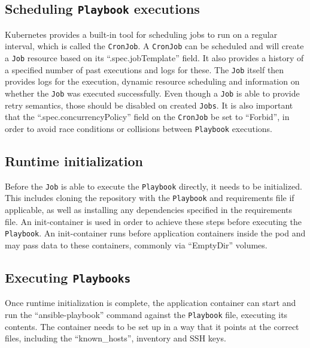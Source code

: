 \subsection{Scheduling \texttt{Playbook} executions}
Kubernetes provides a built-in tool for scheduling jobs to run on a regular interval, which is called the \texttt{CronJob}.
A \texttt{CronJob} can be scheduled and will create a \texttt{Job} resource based on its \enquote{.spec.jobTemplate} field.
It also provides a history of a specified number of past executions and logs for these.
The \texttt{Job} itself then provides logs for the execution, dynamic resource scheduling and information on whether the \texttt{Job} was executed successfully.
Even though a \texttt{Job} is able to provide retry semantics, those should be disabled on created \texttt{Jobs}.
It is also important that the \enquote{.spec.concurrencyPolicy} field on the \texttt{CronJob} be set to \enquote{Forbid}, in order to avoid race conditions or collisions between \texttt{Playbook} executions.

\subsection{Runtime initialization}
Before the \texttt{Job} is able to execute the \texttt{Playbook} directly, it needs to be initialized. This includes cloning the repository with the \texttt{Playbook} and requirements file if applicable, as well as installing any dependencies specified in the requirements file.
An init-container is used in order to achieve these steps before executing the \texttt{Playbook}.
An init-container runs before application containers inside the \gls{pod} and may pass data to these containers, commonly via \enquote{EmptyDir} volumes.

\clearpage
\subsection{Executing \texttt{Playbooks}}
Once runtime initialization is complete, the application container can start and run the \enquote{ansible-playbook} command against the \texttt{Playbook} file, executing its contents.
The container needs to be set up in a way that it points at the correct files, including the \enquote{known\_hosts}, inventory and SSH keys.
